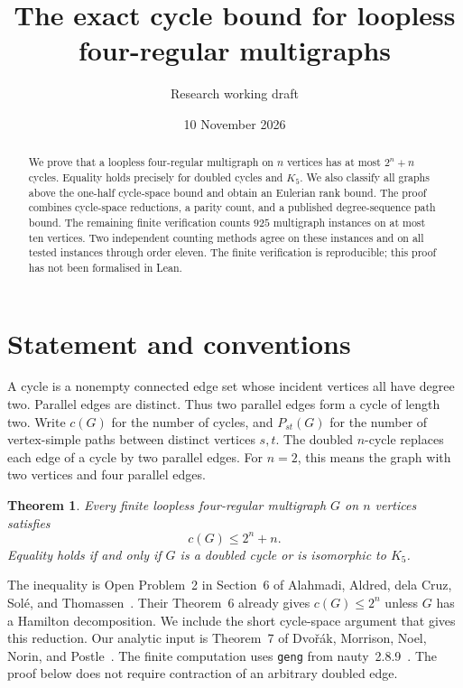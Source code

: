 \documentclass[11pt]{article}
\title{The exact cycle bound for loopless four-regular multigraphs}
\author{Research working draft}
\date{10 November 2026}
\newtheorem{theorem}{Theorem}
\begin{document}
\maketitle

\begin{abstract}
We prove that a loopless four-regular multigraph on $n$ vertices has at most $2^n+n$ cycles.
Equality holds precisely for doubled cycles and $K_5$.
We also classify all graphs above the one-half cycle-space bound and obtain an Eulerian rank bound.
The proof combines cycle-space reductions, a parity count, and a published degree-sequence path bound.
The remaining finite verification counts $925$ multigraph instances on at most ten vertices.
Two independent counting methods agree on these instances and on all tested instances through order eleven.
The finite verification is reproducible; this proof has not been formalised in Lean.
\end{abstract}

\section{Statement and conventions}

A cycle is a nonempty connected edge set whose incident vertices all have degree two.
Parallel edges are distinct.
Thus two parallel edges form a cycle of length two.
Write $c(G)$ for the number of cycles, and $P_{st}(G)$ for the number of vertex-simple paths between distinct vertices $s,t$.
The doubled $n$-cycle replaces each edge of a cycle by two parallel edges.
For $n=2$, this means the graph with two vertices and four parallel edges.

\begin{theorem}\label{thm:main}
Every finite loopless four-regular multigraph $G$ on $n$ vertices satisfies
\[
 c(G)\le2^n+n.
\]
Equality holds if and only if $G$ is a doubled cycle or is isomorphic to $K_5$.
\end{theorem}

The inequality is Open Problem~2 in Section~6 of Alahmadi, Aldred, dela Cruz, Sol\'e, and Thomassen~\cite{aacst}.
Their Theorem~6 already gives $c(G)\le2^n$ unless $G$ has a Hamilton decomposition.
We include the short cycle-space argument that gives this reduction.
Our analytic input is Theorem~7 of Dvo\v r\'ak, Morrison, Noel, Norin, and Postle~\cite{dmnnp}.
The finite computation uses \texttt{geng} from nauty~2.8.9~\cite{nauty}.
The proof below does not require contraction of an arbitrary doubled edge.
\end{document}
